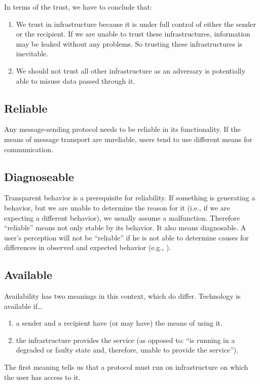 In terms of the trust, we have to conclude that:
\begin{enumerate}
	\item We trust in infrastructure because it is under full control of either the sender or the recipient. If we are unable to trust these infrastructures, information may be leaked without any problems. So trusting these infrastructures is inevitable.
	\item We should not trust all other infrastructure as an adversary is potentially able to misuse data passed through it.
\end{enumerate}

\subsection{Reliable}
Any message-sending protocol needs to be reliable in its functionality. If the means of message transport are unreliable, users tend to use different means for communication\cite{zhou2011examining}. 

\subsection{Diagnoseable}
Transparent behavior is a prerequisite for reliability. If something is generating a  behavior, but we are unable to determine the reason for it (i.e., if we are expecting a different behavior), we usually assume a malfunction. Therefore ``reliable'' means not only stable by its behavior. It also means diagnosable. A user's perception will not be ``reliable'' if he is not able to determine causes for differences in observed and expected behavior (e.g., \cite{nicholson2003assessing}).

\subsection{Available}
Availability has two meanings in this context, which do differ. Technology is available if\ldots
\begin{enumerate}
	\item a sender and a recipient have (or may have) the means of using it.
	\item the infrastructure provides the service (as opposed to: ``is running in a degraded or faulty state and, therefore, unable to provide the service'').
\end{enumerate}

The first meaning tells us that a protocol must run on infrastructure on which the user has access to it.

